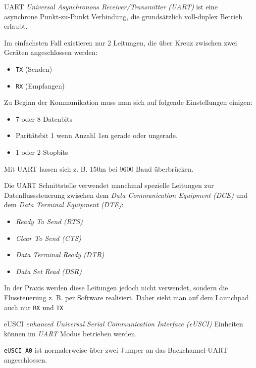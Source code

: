\begin{defi}{UART}
    \emph{Universal Asynchronous Receiver/Transmitter (UART)} ist eine asynchrone Punkt-zu-Punkt Verbindung, die grundsätzlich voll-duplex Betrieb erlaubt.

    Im einfachsten Fall existieren nur 2 Leitungen, die über Kreuz zwischen zwei Geräten angeschlossen werden:
    \begin{itemize}
        \item \texttt{TX} (Senden)
        \item \texttt{RX} (Empfangen)
    \end{itemize}

    Zu Beginn der Kommunikation muss man sich auf folgende Einstellungen einigen:
    \begin{itemize}
        \item 7 oder 8 Datenbits
        \item Paritätsbit 1 wenn Anzahl 1en gerade oder ungerade.
        \item 1 oder 2 Stopbits
    \end{itemize}

    Mit UART lassen sich z. B. 150m bei 9600 Baud überbrücken.

    Die UART Schnittstelle verwendet manchmal spezielle Leitungen zur Datenflusssteuerung zwischen dem \emph{Data Communication Equipment (DCE)} und dem \emph{Data Terminal Equipment (DTE)}:
    \begin{itemize}
        \item \emph{Ready To Send (RTS)}
        \item \emph{Clear To Send (CTS)}
        \item \emph{Data Terminal Ready (DTR)}
        \item \emph{Data Set Read (DSR)}
    \end{itemize}

    In der Praxis werden diese Leitungen jedoch nicht verwendet, sondern die Flussteuerung z. B. per Software realisiert.
    Daher sieht man auf dem Launchpad auch nur \texttt{RX} und \texttt{TX}
\end{defi}

\begin{defi}{eUSCI}
    \emph{enhanced Universal Serial Communication Interface (eUSCI)} Einheiten können im \emph{UART} Modus betrieben werden.

    \texttt{eUSCI\_A0} ist normalerweise über zwei Jumper an das Backchannel-UART angeschlossen.
\end{defi}

